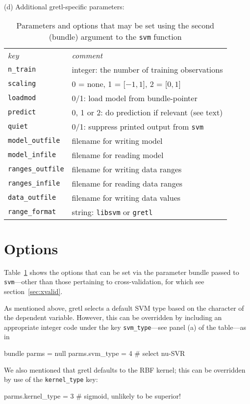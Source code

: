 \documentclass{article}
\begin{document}
\begin{table}[p]
  (d) Additional gretl-specific parameters:
  \begin{center}
  \begin{tabular}{ll}
    \textit{key} & \textit{comment} \\[2pt]
    \texttt{n\_train} & integer: the number of training observations \\
    \texttt{scaling} & 0 = none, 1 = [$-1,1$], 2 = [$0,1$] \\
    \texttt{loadmod} & 0/1: load model from bundle-pointer \\
    \texttt{predict} & 0, 1 or 2: do prediction if relevant (see text) \\
    \texttt{quiet} & 0/1: suppress printed output from \texttt{svm} \\
    \texttt{model\_outfile} & filename for writing model \\
    \texttt{model\_infile} & filename for reading model \\
    \texttt{ranges\_outfile} & filename for writing data ranges \\
    \texttt{ranges\_infile} & filename for reading data ranges \\
    \texttt{data\_outfile} & filename for writing data values \\
    \texttt{range\_format} & string: \texttt{libsvm} or \texttt{gretl}
  \end{tabular}
  \end{center}
  \caption{Parameters and options that may be set using the second
    (bundle) argument to the \texttt{svm} function}
  \label{tab:options}
\end{table}

\section{Options}
\label{sec:options}

Table~\ref{tab:options} shows the options that can be set via the
parameter bundle passed to \texttt{svm}---other than those pertaining
to cross-validation, for which see section~\ref{sec:xvalid}.

As mentioned above, gretl selects a default SVM type based on the
character of the dependent variable. However, this can be overridden
by including an appropriate integer code under the key
\texttt{svm\_type}---see panel (a) of the table---as in
\begin{code}
bundle parms = null
parms.svm_type = 4 # select nu-SVR
\end{code}
We also mentioned that gretl defaults to the RBF kernel; this can be
overridden by use of the \texttt{kernel\_type} key:
\begin{code}
parms.kernel_type = 3 # sigmoid, unlikely to be superior!
\end{code}
\end{document}
